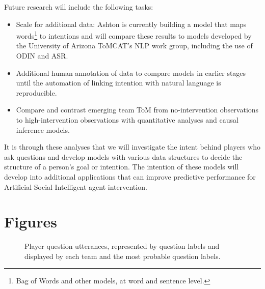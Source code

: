 Future research will include the following tasks:
\begin{itemize}
    \item Scale for additional data: Ashton is currently building a model that maps words\footnote{Bag of Words and other models, at word and sentence level.} to intentions and will compare these results to models developed by the University of Arizona ToMCAT's NLP work group, including the use of ODIN and ASR.
    \item Additional human annotation of data to compare models in earlier stages until the automation of linking intention with natural language is reproducible.
    \item Compare and contrast emerging team ToM from no-intervention observations to high-intervention observations with quantitative analyses and causal inference models.
\end{itemize}

It is through these analyses that we will investigate the intent behind players who ask questions and develop models with various data structures to decide the structure of a person's goal or intention. The intention of these models will develop into additional applications that can improve predictive performance for Artificial Social Intelligent agent intervention.


\section{Figures}

\begin{figure}[h!]
    \centering
    \caption{Player question utterances, represented by question labels and displayed by each team and the most probable question labels.}
\end{figure}

